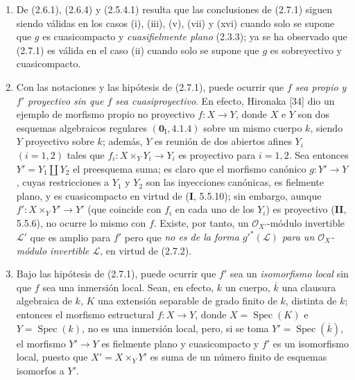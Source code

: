 \begin{remarks}[2.7.3]
\label{IV.2.7.3-fr}
\begin{enumerate}
\item[(i)] De (2.6.1), (2.6.4) y (2.5.4.1) resulta que las conclusiones
de (2.7.1) siguen siendo válidas en los casos (i), (iii), (v), (vii) y
(xvi) cuando solo se supone que $g$ es cuasicompacto y
\emph{cuasifielmente plano} (2.3.3); ya se ha observado que (2.7.1) es válida
en el caso (ii) cuando solo se supone que $g$ es sobreyectivo y cuasicompacto.

\item[(ii)] Con las notaciones y las hipótesis de (2.7.1), puede ocurrir
que \emph{$f$ sea propio y $f'$ proyectivo sin que $f$ sea cuasiproyectivo}. En
efecto, Hironaka [34] dio un ejemplo de morfismo propio no proyectivo
$f:X\to Y$, donde $X$ e $Y$ son dos esquemas algebraicos regulares
$(\mathbf{0}_{\mathrm I},4.1.4)$ sobre un mismo cuerpo $k$, siendo $Y$ proyectivo sobre $k$;
además, $Y$ es reunión de dos abiertos afines $Y_i$ $(i=1,2)$ tales que
$f_i:X\times_Y Y_i\to Y_i$ es proyectivo para $i=1,2$. Sea entonces
$Y'=Y_1\amalg Y_2$ el preesquema suma; es claro que el morfismo
canónico $g:Y'\to Y$, cuyas restricciones a $Y_1$ y $Y_2$ son las
inyecciones canónicas, es fielmente plano, y es cuasicompacto en virtud de
(\textbf I, 5.5.10); sin embargo, aunque $f':X\times_Y Y'\to Y'$ (que coincide con
$f_i$ en cada uno de los $Y_i$) es proyectivo (\textbf{II}, 5.5.6), no ocurre lo
mismo con $f$. Existe, por tanto, un $\mathcal O_{X'}$-módulo invertible
$\mathcal L'$ que es amplio para $f'$ pero que \emph{no es de la forma
$g'^*(\mathcal L)$ para un $\mathcal O_X$-módulo invertible $\mathcal L$}, en
virtud de (2.7.2).

\item[(iii)] Bajo las hipótesis de (2.7.1), puede ocurrir que $f'$ sea
un \emph{isomorfismo local} sin que $f$ sea una inmersión local. Sean, en
efecto, $k$ un cuerpo, $\overline k$ una clausura algebraica de $k$, $K$ una
extensión separable de grado finito de $k$, distinta de $k$; entonces el
morfismo estructural $f:X\to Y$, donde $X=\operatorname{Spec}(K)$ e
$Y=\operatorname{Spec}(k)$, no es una inmersión local, pero, si se toma
$Y'=\operatorname{Spec}(\overline k)$, el morfismo $Y'\to Y$ es
fielmente plano y cuasicompacto y $f'$ es un isomorfismo local, puesto que
$X'=X\times_Y Y'$ es suma de un número finito de esquemas isomorfos a $Y'$.
\end{enumerate}
\end{remarks}

